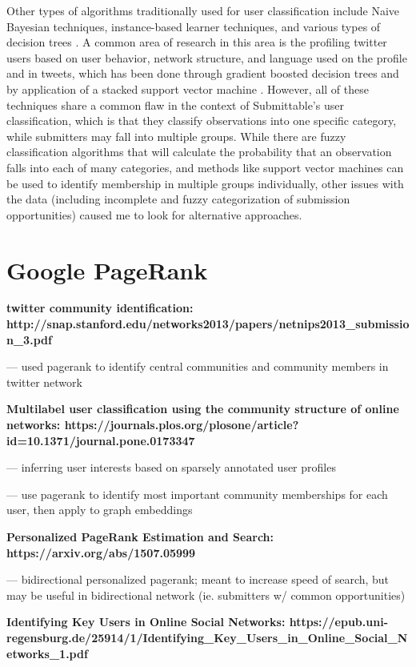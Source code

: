 \documentclass[]{report}   %
\begin{document}
Other types of algorithms traditionally used for user classification include Naive Bayesian techniques, instance-based learner techniques,  and various types of decision trees \cite{cufoglu_lohi_madani_2009}. A common area of research in this area is the profiling twitter users based on user behavior, network structure, and language used on the profile and in tweets, which has been done through gradient boosted decision trees \cite{pennacchiotti_popescu_2011} and by application of a stacked support vector machine \cite{rao_yarowsky_shreevats_gupta_2010}. However, all of these techniques share a common flaw in the context of Submittable's user classification, which is that they classify observations into one specific category, while submitters may fall into multiple groups. While there are fuzzy classification algorithms that will calculate the probability that an observation falls into each of many categories, and methods like support vector machines can be used to identify membership in multiple groups individually, other issues with the data (including incomplete and fuzzy categorization of submission opportunities) caused me to look for alternative approaches.

\section{Google PageRank}

\textbf{twitter community identification: http://snap.stanford.edu/networks2013/papers/netnips2013\_submission\_3.pdf}

--- used pagerank to identify central communities and community members in twitter network

\textbf{Multilabel user classification using the community structure of online networks: https://journals.plos.org/plosone/article?id=10.1371/journal.pone.0173347}

--- inferring user interests based on sparsely annotated user profiles

--- use pagerank to identify most important community memberships for each user, then apply to graph embeddings

\textbf{Personalized PageRank Estimation and Search: https://arxiv.org/abs/1507.05999}

--- bidirectional personalized pagerank; meant to increase speed of search, but may be useful in bidirectional network (ie. submitters w/ common opportunities)

\textbf{Identifying Key Users in Online Social Networks: https://epub.uni-regensburg.de/25914/1/Identifying\_Key\_Users\_in\_Online\_Social\_Networks\_1.pdf}
\end{document}

